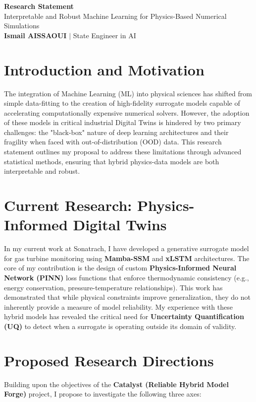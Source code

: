 \documentclass[a4paper,11pt]{article}
\begin{document}
\begin{center}
    {\LARGE\bfseries\color{titleblue} Research Statement}\\[6pt]
    {\large Interpretable and Robust Machine Learning for Physics-Based Numerical Simulations}\\[4pt]
    \textbf{Ismail AISSAOUI} $|$ State Engineer in AI
\end{center}

\bigskip

\section{Introduction and Motivation}
The integration of Machine Learning (ML) into physical sciences has shifted from simple data-fitting to the creation of high-fidelity surrogate models capable of accelerating computationally expensive numerical solvers. However, the adoption of these models in critical industrial Digital Twins is hindered by two primary challenges: the "black-box" nature of deep learning architectures and their fragility when faced with out-of-distribution (OOD) data. This research statement outlines my proposal to address these limitations through advanced statistical methods, ensuring that hybrid physics-data models are both interpretable and robust.

\section{Current Research: Physics-Informed Digital Twins}
In my current work at Sonatrach, I have developed a generative surrogate model for gas turbine monitoring using \textbf{Mamba-SSM} and \textbf{xLSTM} architectures. The core of my contribution is the design of custom \textbf{Physics-Informed Neural Network (PINN)} loss functions that enforce thermodynamic consistency (e.g., energy conservation, pressure-temperature relationships). This work has demonstrated that while physical constraints improve generalization, they do not inherently provide a measure of model reliability. My experience with these hybrid models has revealed the critical need for \textbf{Uncertainty Quantification (UQ)} to detect when a surrogate is operating outside its domain of validity.

\section{Proposed Research Directions}
Building upon the objectives of the \textbf{Catalyst (Reliable Hybrid Model Forge)} project, I propose to investigate the following three axes:
\end{document}

